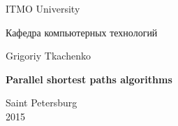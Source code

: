 \documentclass{report}
\theoremstyle{plain}
\theoremstyle{definition}
\numberwithin{theorem}{chapter}        %
\begin{document}

\initializefrontsections

\pagestyle{title}

\begin{center}
ITMO University
\vspace{2cm}

Кафедра компьютерных технологий

\vspace{3cm}

{\Large Grigoriy Tkachenko}

\vspace{2cm}

\vbox{\LARGE\bfseries
Parallel shortest paths algorithms}

\vspace{4cm}

    

\vspace{1cm}

{\Large }

\vspace{8cm}

Saint Petersburg\\ 2015
\end{center}

\newpage

\setcounter{page}{2}
\pagestyle{plain}



\tableofcontents


\def\t#1{\mbox{\texttt{\hbox{#1}}}}
\def\b#1{\textbf{#1}}
\def\tb#1{\t{\b{#1}}}

\def\cln#1{\t{#1}}
\def\pcn#1{\t{#1}}
\newcommand{\p}{\par Здесь будет текст...}

\def\drawfigure#1#2#3{
        \begin{figure}[ht]
        \centerline{ \texttt{[image: img/\#1]}}
        \caption{#2}
        \label{#3}
        \end{figure}
}
\def\drawfigurex#1#2#3#4{
        \begin{figure}[ht]
        \centerline{ \texttt{[image: img/\#1]}}
        \caption{#2}
        \label{#3}
        \end{figure}
}

\startthechapters


\end{document}
